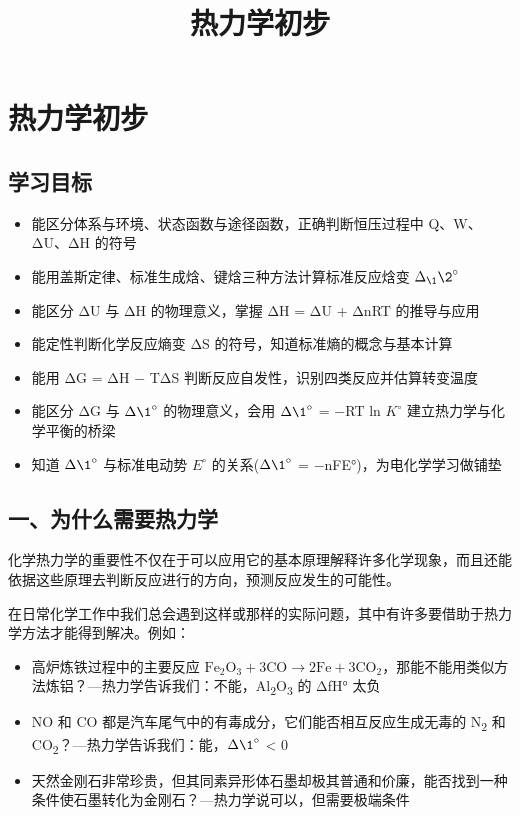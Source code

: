 \documentclass[a4paper,11pt]{ctexart}
\title{热力学初步}
\date{}
\providecommand{\tightlist}{\setlength{\itemsep}{0pt}\setlength{\parskip}{0pt}}
\begin{document}
\maketitle
\tableofcontents
\newpage
\section{热力学初步}\label{ux70edux529bux5b66ux521dux6b65}

\subsection{学习目标}\label{ux5b66ux4e60ux76eeux6807}

\begin{itemize}
\tightlist
\item
  能区分体系与环境、状态函数与途径函数，正确判断恒压过程中 Q、W、ΔU、ΔH 的符号
\item
  能用盖斯定律、标准生成焓、键焓三种方法计算标准反应焓变 \(\Delta_{\1} \2^{\circ}\)
\item
  能区分 ΔU 与 ΔH 的物理意义，掌握 ΔH = ΔU + ΔnRT 的推导与应用
\item
  能定性判断化学反应熵变 ΔS 的符号，知道标准熵的概念与基本计算
\item
  能用 ΔG = ΔH − TΔS 判断反应自发性，识别四类反应并估算转变温度
\item
  能区分 ΔG 与 \(\Delta \1^{\circ}\) 的物理意义，会用 \(\Delta \1^{\circ}\) = −RT ln \(K^{\circ}\) 建立热力学与化学平衡的桥梁
\item
  知道 \(\Delta \1^{\circ}\) 与标准电动势 \(E^{\circ}\) 的关系(\(\Delta \1^{\circ}\) = −nFE°)，为电化学学习做铺垫
\end{itemize}

\subsection{一、为什么需要热力学}\label{ux4e00ux4e3aux4ec0ux4e48ux9700ux8981ux70edux529bux5b66}

化学热力学的重要性不仅在于可以应用它的基本原理解释许多化学现象，而且还能依据这些原理去判断反应进行的方向，预测反应发生的可能性。

在日常化学工作中我们总会遇到这样或那样的实际问题，其中有许多要借助于热力学方法才能得到解决。例如：

\begin{itemize}
\tightlist
\item
  高炉炼铁过程中的主要反应 \(\mathrm{Fe_2O_3 + 3CO \to 2Fe + 3CO_2}\)，那能不能用类似方法炼铝？---热力学告诉我们：不能，Al\textsubscript{2}O\textsubscript{3} 的 ΔfH° 太负
\item
  NO 和 CO 都是汽车尾气中的有毒成分，它们能否相互反应生成无毒的 N\textsubscript{2} 和 CO\textsubscript{2}？---热力学告诉我们：能，\(\Delta \1^{\circ}\) \textless{} 0
\item
  天然金刚石非常珍贵，但其同素异形体石墨却极其普通和价廉，能否找到一种条件使石墨转化为金刚石？---热力学说可以，但需要极端条件
\end{itemize}
\end{document}
